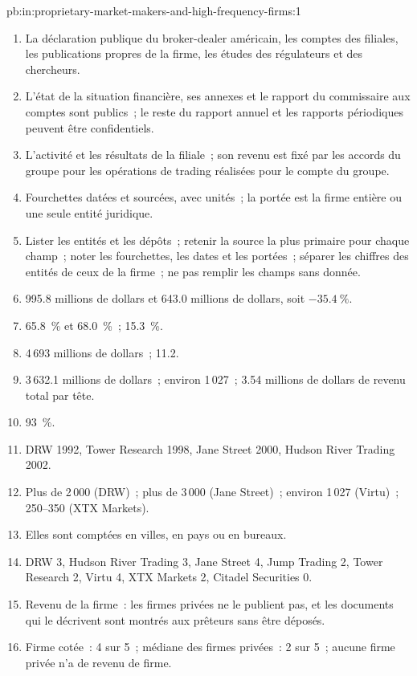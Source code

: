 \begin{solution}{pb:in:proprietary-market-makers-and-high-frequency-firms:1}
\begin{enumerate}
\item La déclaration publique du broker-dealer américain, les comptes des filiales, les publications propres de la firme, les études des régulateurs et
des chercheurs.
\item L'état de la situation financière, ses annexes et le rapport du commissaire aux comptes sont publics~; le reste du rapport annuel
et les rapports périodiques peuvent être confidentiels.
\item L'activité et les résultats de la filiale~; son revenu est fixé par les accords du groupe pour les opérations de trading réalisées pour le
compte du groupe.
\item Fourchettes datées et sourcées, avec unités~; la portée est la firme entière ou une seule entité juridique.
\item Lister les entités et les dépôts~; retenir la source la plus primaire pour chaque champ~; noter les fourchettes, les dates et les portées~; séparer les
chiffres des entités de ceux de la firme~; ne pas remplir les champs sans donnée.
\item 995.8 millions de dollars et 643.0 millions de dollars, soit $-35.4~\%$.
\item 65.8~\% et 68.0~\%~; 15.3~\%.
\item 4\,693 millions de dollars~; 11.2.
\item 3\,632.1 millions de dollars~; environ 1\,027~; 3.54 millions de dollars de revenu total par tête.
\item 93~\%.
\item DRW 1992, Tower Research 1998, Jane Street 2000, Hudson River Trading 2002.
\item Plus de 2\,000 (DRW)~; plus de 3\,000 (Jane Street)~; environ 1\,027 (Virtu)~; 250--350 (XTX Markets).
\item Elles sont comptées en villes, en pays ou en bureaux.
\item DRW 3, Hudson River Trading 3, Jane Street 4, Jump Trading 2, Tower Research 2, Virtu 4, XTX Markets 2, Citadel
Securities 0.
\item Revenu de la firme~: les firmes privées ne le publient pas, et les documents qui le décrivent sont montrés aux prêteurs sans être déposés.
\item Firme cotée~: 4 sur 5~; médiane des firmes privées~: 2 sur 5~; aucune firme privée n'a de revenu de firme.

\end{enumerate}
\end{solution}
